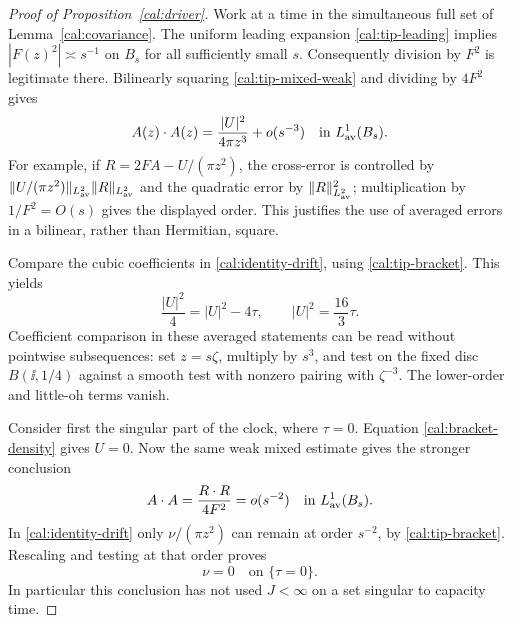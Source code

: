 \begin{proof}[Proof of Proposition~\ref{cal:driver}]
Work at a time in the simultaneous full set of
Lemma~\ref{cal:covariance}.  The uniform leading expansion
\eqref{cal:tip-leading} implies
$|F(z)^2|\asymp s^{-1}$ on $B_s$ for all sufficiently small $s$.
Consequently division by $F^2$ is legitimate there.  Bilinearly squaring
\eqref{cal:tip-mixed-weak} and dividing by $4F^2$ gives
\begin{equation}
 A(z)\cdot A(z)=\frac{|U|^2}{4\pi z^3}+o(s^{-3})
                       \quad\text{in }L^1_{\rm av}(B_s).
 \label{cal:leading-square}
\end{equation}
For example, if $R=2FA-U/(\pi z^2)$, the cross-error is controlled by
$\|U/(\pi z^2)\|_{L^2_{\rm av}}\|R\|_{L^2_{\rm av}}$ and the
quadratic error by $\|R\|_{L^2_{\rm av}}^2$; multiplication by
$1/F^2=O(s)$ gives the displayed order.  This justifies the use of
averaged errors in a bilinear, rather than Hermitian, square.

Compare the cubic coefficients in
\eqref{cal:identity-drift}, using \eqref{cal:tip-bracket}.  This yields
\begin{equation}
 \frac{|U|^2}{4}=|U|^2-4\tau,
 \qquad |U|^2=\frac{16}{3}\tau.
 \label{cal:bracket-density}
\end{equation}
Coefficient comparison in these averaged statements can be read
without pointwise subsequences: set $z=s\zeta$, multiply by $s^3$,
and test on the fixed disc $B(\ii,1/4)$ against a smooth test with
nonzero pairing with $\zeta^{-3}$.  The lower-order and little-oh
terms vanish.

Consider first the singular part of the clock, where $\tau=0$.
Equation \eqref{cal:bracket-density} gives $U=0$.  Now the same weak
mixed estimate gives the stronger conclusion
\[
 A\cdot A=\frac{R\cdot R}{4F^2}=o(s^{-2})
                     \quad\text{in }L^1_{\rm av}(B_s).
\]
In \eqref{cal:identity-drift} only $\nu/(\pi z^2)$ can remain at
order $s^{-2}$, by \eqref{cal:tip-bracket}.  Rescaling and testing at
that order proves
\begin{equation}
 \nu=0\quad\text{on }\{\tau=0\}.
 \label{cal:singular-elimination}
\end{equation}
In particular this conclusion has not used $J<\infty$ on a set
singular to capacity time.


\end{proof}

